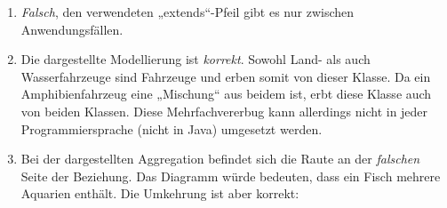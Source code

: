 \documentclass{bschlangaul-aufgabe}
\begin{document}
\begin{enumerate}
\item \strut


\begin{bAntwort}
\emph{Falsch}, den verwendeten „extends“-Pfeil gibt es nur zwischen
Anwendungsfällen.

\end{bAntwort}

\item \strut


\begin{bAntwort}
Die dargestellte Modellierung ist \emph{korrekt}. Sowohl Land- als auch
Wasserfahrzeuge sind Fahrzeuge und erben somit von dieser Klasse. Da
ein Amphibienfahrzeug eine „Mischung“ aus beidem ist, erbt diese Klasse
auch von beiden Klassen. Diese Mehrfachvererbug kann allerdings nicht
in jeder Programmiersprache (\zB nicht in Java) umgesetzt
werden.
\end{bAntwort}

\item \strut


\begin{bAntwort}
Bei der dargestellten Aggregation befindet sich die Raute an der
\emph{falschen} Seite der Beziehung. Das Diagramm würde bedeuten, dass
ein Fisch mehrere Aquarien enthält. Die Umkehrung ist aber korrekt:


\end{bAntwort}
\end{enumerate}
\end{document}
